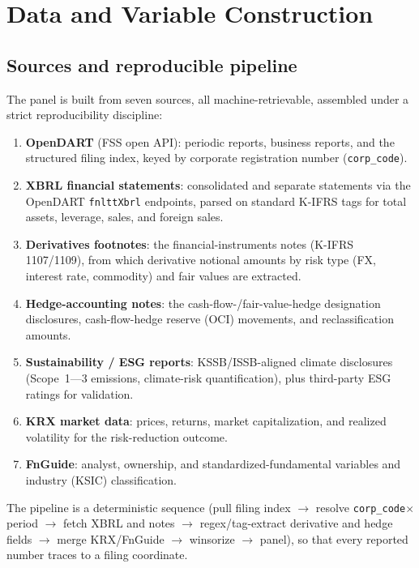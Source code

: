 \documentclass[11pt,a4paper]{article}
\begin{document}
\section{Data and Variable Construction}
\label{sec:data}

\subsection{Sources and reproducible pipeline}
\label{sec:sources}

The panel is built from seven sources, all machine-retrievable, assembled under a strict reproducibility discipline:
\begin{enumerate}
\item \textbf{OpenDART} (FSS open API): periodic reports, business reports, and the structured filing index, keyed by corporate registration number (\texttt{corp\_code}).
\item \textbf{XBRL financial statements}: consolidated and separate statements via the OpenDART \texttt{fnlttXbrl} endpoints, parsed on standard K-IFRS tags for total assets, leverage, sales, and foreign sales.
\item \textbf{Derivatives footnotes}: the financial-instruments notes (K-IFRS 1107/1109), from which derivative notional amounts by risk type (FX, interest rate, commodity) and fair values are extracted.
\item \textbf{Hedge-accounting notes}: the cash-flow-/fair-value-hedge designation disclosures, cash-flow-hedge reserve (OCI) movements, and reclassification amounts.
\item \textbf{Sustainability / ESG reports}: KSSB/ISSB-aligned climate disclosures (Scope~1---3 emissions, climate-risk quantification), plus third-party ESG ratings for validation.
\item \textbf{KRX market data}: prices, returns, market capitalization, and realized volatility for the risk-reduction outcome.
\item \textbf{FnGuide}: analyst, ownership, and standardized-fundamental variables and industry (KSIC) classification.
\end{enumerate}
The pipeline is a deterministic sequence (pull filing index $\to$ resolve \texttt{corp\_code}$\times$period $\to$ fetch XBRL and notes $\to$ regex/tag-extract derivative and hedge fields $\to$ merge KRX/FnGuide $\to$ winsorize $\to$ panel), so that every reported number traces to a filing coordinate.
\end{document}
